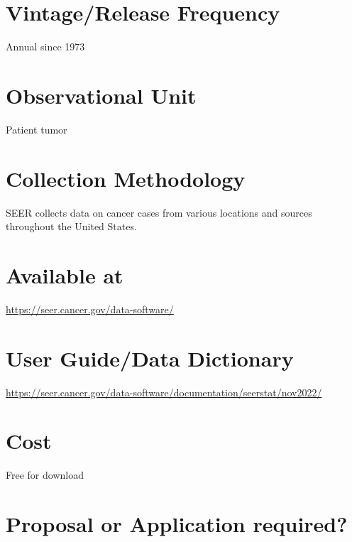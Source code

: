 \documentclass[
]{book}
\begin{document}
\hypertarget{vintagerelease-frequency-86}{%
\section{Vintage/Release Frequency}\label{vintagerelease-frequency-86}}

Annual since 1973

\hypertarget{observational-unit-86}{%
\section{Observational Unit}\label{observational-unit-86}}

Patient tumor

\hypertarget{collection-methodology-86}{%
\section{Collection Methodology}\label{collection-methodology-86}}

SEER collects data on cancer cases from various locations and sources throughout the United States.

\hypertarget{available-at-86}{%
\section{Available at}\label{available-at-86}}

\url{https://seer.cancer.gov/data-software/}

\hypertarget{user-guidedata-dictionary-86}{%
\section{User Guide/Data Dictionary}\label{user-guidedata-dictionary-86}}

\url{https://seer.cancer.gov/data-software/documentation/seerstat/nov2022/}

\hypertarget{cost-86}{%
\section{Cost}\label{cost-86}}

Free for download

\hypertarget{proposal-or-application-required-86}{%
\section{Proposal or Application required?}\label{proposal-or-application-required-86}}
\end{document}
